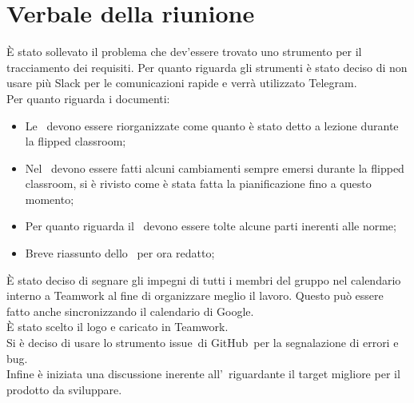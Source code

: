 \documentclass[../Riunione16-01-07.tex]{subfiles}
\begin{document}
\section{Verbale della riunione}
È stato sollevato il problema che dev'essere trovato uno strumento per il tracciamento dei requisiti. Per quanto riguarda gli strumenti è stato deciso di non usare più Slack per le comunicazioni rapide e verrà utilizzato Telegram. \\
Per quanto riguarda i documenti:
\begin{itemize}
	\item Le \normediprogetto\ devono essere riorganizzate come quanto è stato detto a lezione durante la flipped classroom;
	\item Nel \pianodiprogetto\ devono essere fatti alcuni cambiamenti sempre emersi durante la flipped classroom, si è rivisto come è stata fatta la pianificazione fino a questo momento;
	\item Per quanto riguarda il \pianodiqualifica\ devono essere tolte alcune parti inerenti alle norme;
	\item Breve riassunto dello \studiodifattibilita\ per ora redatto;
\end{itemize}
È stato deciso di segnare gli impegni di tutti i membri del gruppo nel calendario interno a Teamwork al fine di organizzare meglio il lavoro. Questo può essere fatto anche sincronizzando il calendario di Google.\\
È stato scelto il logo e caricato in Teamwork.\\
Si è deciso di usare lo strumento issue\g\ di GitHub\g\ per la segnalazione di errori e bug.\\
Infine è iniziata una discussione inerente all'\analisideirequisiti\ riguardante il target migliore per il prodotto da sviluppare.
\end{document}
